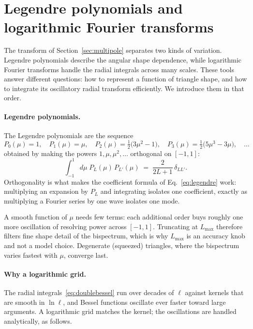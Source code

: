 \documentclass[11pt]{article}
\numberwithin{equation}{section}
\begin{document}
\section{Legendre polynomials and logarithmic Fourier transforms}
\label{app:legendre}

The transform of Section~\ref{sec:multipole} separates two kinds of
variation. Legendre polynomials describe the angular shape dependence,
while logarithmic Fourier transforms handle the radial integrals across
many scales. These tools answer different questions: how to represent a
function of triangle shape, and how to integrate its oscillatory radial
transform efficiently. We introduce them in that order.

\paragraph{Legendre polynomials.}
The Legendre polynomials are the sequence
\begin{equation}
  P_0(\mu) = 1, \quad
  P_1(\mu) = \mu, \quad
  P_2(\mu) = \tfrac12\bigl(3\mu^2 - 1\bigr), \quad
  P_3(\mu) = \tfrac12\bigl(5\mu^3 - 3\mu\bigr), \quad \ldots
  \label{eq:legendrelist}
\end{equation}
obtained by making the powers $1, \mu, \mu^2, \ldots$ orthogonal on
$[-1, 1]$:
\begin{equation}
  \int_{-1}^{1} d\mu\; P_L(\mu)\, P_{L'}(\mu)
  \;=\; \frac{2}{2L + 1}\,\delta_{LL'} .
  \label{eq:legendreortho}
\end{equation}
Orthogonality is what makes the coefficient formula of
Eq.~\eqref{eq:legendre} work: multiplying an expansion by
$P_L$ and integrating isolates one coefficient, exactly as
multiplying a Fourier series by one wave isolates one mode.

A smooth function of $\mu$ needs few terms: each additional order
buys roughly one more oscillation of resolving power across
$[-1,1]$.  Truncating at $L_{\max}$ therefore filters fine shape
detail of the bispectrum, which is why
$L_{\max}$ is an accuracy knob and not a model choice.  Degenerate
(squeezed) triangles, where the bispectrum varies fastest with
$\mu$, converge last.

\paragraph{Why a logarithmic grid.}
The radial integrals~\eqref{eq:doublebessel} run over decades of
$\ell$ against kernels that are smooth in $\ln\ell$, and Bessel
functions oscillate ever faster toward large arguments.  A
logarithmic grid matches the kernel; the oscillations are handled
analytically, as follows.
\end{document}
